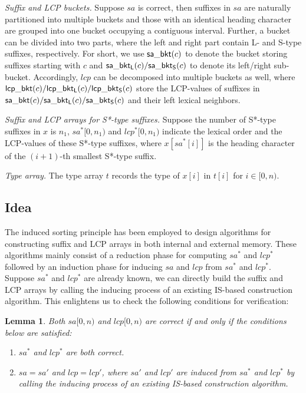 \documentclass[10pt,journal,compsoc]{IEEEtran}
\newtheorem{Lemma}{Lemma}
\begin{document}
{\em Suffix and LCP buckets.} Suppose $sa$ is correct, then suffixes in $sa$ are naturally partitioned into multiple buckets and those with an identical heading character are grouped into one bucket occupying a contiguous interval. Further, a bucket can be divided into two parts, where the left and right part contain L- and S-type suffixes, respectively. For short, we use ${\sf sa\_bkt}(c)$ to denote the bucket storing suffixes starting with $c$ and ${\sf sa\_bkt_L}(c)/{\sf sa\_bkt_S}(c)$ to denote its left/right sub-bucket. Accordingly, $lcp$ can be decomposed into multiple buckets as well, where ${\sf lcp\_bkt}(c)/{\sf lcp\_bkt_L}(c)/{\sf lcp\_bkt_S}(c)$ store the LCP-values of suffixes in ${\sf sa\_bkt}(c)/{\sf sa\_bkt_L}(c)/{\sf sa\_bkt_S}(c)$ and their left lexical neighbors.

{\em Suffix and LCP arrays for S*-type suffixes.} Suppose the number of S*-type suffixes in $x$ is $n_1$, $sa^*[0, n_1)$ and $lcp^*[0, n_1)$ indicate the lexical order and the LCP-values of these S*-type suffixes, where $x[sa^*[i]]$ is the heading character of the $(i + 1)$-th smallest S*-type suffix.

{\em Type array.} The type array $t$ records the type of $x[i]$ in $t[i]$ for $i \in [0, n)$.

\subsection{Idea} \label{sec:method2:idea}

The induced sorting principle has been employed to design algorithms for constructing suffix and LCP arrays in both internal and external memory. These algorithms mainly consist of a reduction phase for computing $sa^*$ and $lcp^*$ followed by an induction phase for inducing $sa$ and $lcp$ from $sa^*$ and $lcp^*$. Suppose $sa^*$ and $lcp^*$ are already known, we can directly build the suffix and LCP arrays by calling the inducing process of an existing IS-based construction algorithm. This enlightens us to check the following conditions for verification:
	
\begin{Lemma} \label{lemma:2}
Both $sa[0, n)$ and $lcp[0, n)$ are correct if and only if the conditions below are satisfied:

\begin{enumerate}[(1)]
	\item
	$sa^*$ and $lcp^*$ are both correct.
	\item
	$sa = sa'$ and $lcp = lcp'$, where $sa'$ and $lcp'$ are induced from $sa^*$ and $lcp^*$ by calling the inducing process of an existing IS-based construction algorithm.
\end{enumerate}
\end{Lemma}
\end{document}
